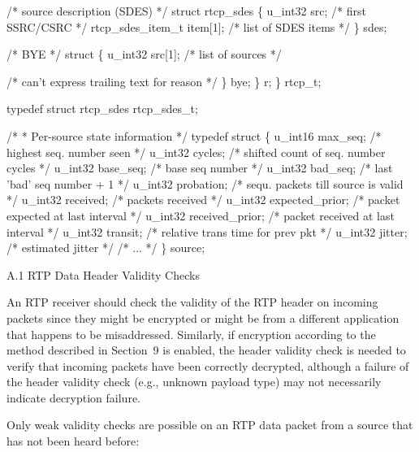 \documentclass{article}
\begin{document}
/* source description (SDES) */ struct rtcp\_sdes \{ u\_int32 src;      /* first SSRC/CSRC */ rtcp\_sdes\_item\_t item[1]; /* list of SDES items */ \} sdes;

/* BYE */ struct \{ u\_int32 src[1];   /* list of sources */

/* can't express trailing text for reason */ \} bye; \} r; \} rtcp\_t;

typedef struct rtcp\_sdes rtcp\_sdes\_t;

/* * Per-source state information */ typedef struct \{ u\_int16 max\_seq;        /* highest seq. number seen */ u\_int32 cycles;         /* shifted count of seq. number cycles */ u\_int32 base\_seq;       /* base seq number */ u\_int32 bad\_seq;        /* last 'bad' seq number + 1 */ u\_int32 probation;      /* sequ. packets till source is valid */ u\_int32 received;       /* packets received */ u\_int32 expected\_prior; /* packet expected at last interval */ u\_int32 received\_prior; /* packet received at last interval */ u\_int32 transit;        /* relative trans time for prev pkt */ u\_int32 jitter;         /* estimated jitter */ /* ... */ \} source;

A.1 RTP Data Header Validity Checks

An RTP receiver should check the validity of the RTP header on incoming packets since they might be encrypted or might be from a different application that happens to be misaddressed.  Similarly, if encryption according to the method described in Section~9 is enabled, the header validity check is needed to verify that incoming packets have been correctly decrypted, although a failure of the header validity check (e.g., unknown payload type) may not necessarily indicate decryption failure.

Only weak validity checks are possible on an RTP data packet from a source that has not been heard before:
\end{document}
